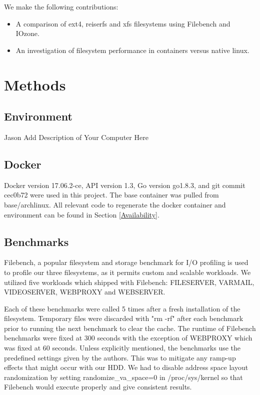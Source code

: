 \documentclass[letterpaper,twocolumn,10pt]{article}
\begin{document}
We make the following contributions:
\begin{itemize}
  \item A comparison of ext4, reiserfs and xfs filesystems using Filebench and IOzone.
  \item An investigation of filesystem performance in containers versus native linux.
\end{itemize}

\section{Methods}

\subsection{Environment}
Jason Add Description of Your Computer Here

\subsection{Docker}
Docker version 17.06.2-ce, API version 1.3, Go version go1.8.3, and git commit cec0b72 were used in this project. The base container was pulled from base/archlinux. All relevant code to regenerate the docker container and environment can be found in Section \ref{Availability}.

\subsection{Benchmarks}
Filebench, a popular filesystem and storage benchmark for I/O profiling is used to profile our three filesystems, as it permits custom and scalable workloads. We utilized five workloads which shipped with Filebench: FILESERVER, VARMAIL, VIDEOSERVER, WEBPROXY and WEBSERVER. 

Each of these benchmarks were called 5 times after a fresh installation of the filesystem. Temporary files were discarded with "rm -rf" after each benchmark prior to running the next benchmark to clear the cache. The runtime of Filebench benchmarks were fixed at 300 seconds with the exception of WEBPROXY which was fixed at 60 seconds. Unless explicitly mentioned, the benchmarks use the predefined settings given by the authors. This was to mitigate any ramp-up effects that might occur with our HDD. We had to disable address space layout randomization by setting randomize\_va\_space=0 in /proc/sys/kernel so that Filebench would execute properly and give consistent results.
\end{document}
